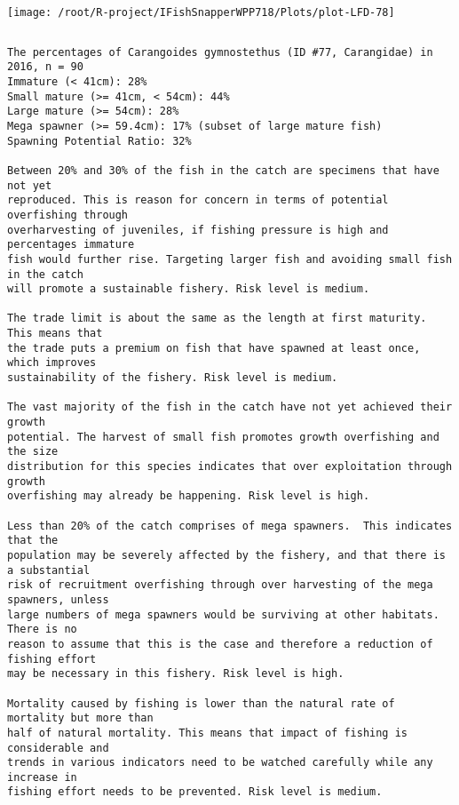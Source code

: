 \documentclass{report}\usepackage[]{graphicx}\usepackage[]{color}
\makeatletter
\def\maxwidth{ %
  \ifdim\Gin@nat@width>\linewidth
    \linewidth
  \else
    \Gin@nat@width
  \fi
}
\newenvironment{kframe}{%
 \def\at@end@of@kframe{}%
 \ifinner\ifhmode%
  \def\at@end@of@kframe{\end{minipage}}%
  \begin{minipage}{\columnwidth}%
 \fi\fi%
 \def\FrameCommand##1{\hskip\@totalleftmargin \hskip-\fboxsep
 \colorbox{shadecolor}{##1}\hskip-\fboxsep
     \hskip-\linewidth \hskip-\@totalleftmargin \hskip\columnwidth}%
 \MakeFramed {\advance\hsize-\width
   \@totalleftmargin\z@ \linewidth\hsize
   \@setminipage}}%
 {\par\unskip\endMakeFramed%
 \at@end@of@kframe}
\newenvironment{knitrout}{}{} %
\makeatother
\begin{document}
\begin{knitrout}
\texttt{[image: /root/R-project/IFishSnapperWPP718/Plots/plot-LFD-78]} 
\begin{kframe}\begin{verbatim}
\end{verbatim}
\end{kframe}
\clearpage
\newpage
\begin{kframe}\begin{verbatim}The percentages of Carangoides gymnostethus (ID #77, Carangidae) in 2016, n = 90
Immature (< 41cm): 28%
Small mature (>= 41cm, < 54cm): 44%
Large mature (>= 54cm): 28%
Mega spawner (>= 59.4cm): 17% (subset of large mature fish)
Spawning Potential Ratio: 32%
 
Between 20% and 30% of the fish in the catch are specimens that have not yet
reproduced. This is reason for concern in terms of potential overfishing through
overharvesting of juveniles, if fishing pressure is high and percentages immature
fish would further rise. Targeting larger fish and avoiding small fish in the catch
will promote a sustainable fishery. Risk level is medium.

The trade limit is about the same as the length at first maturity.  This means that
the trade puts a premium on fish that have spawned at least once, which improves
sustainability of the fishery. Risk level is medium.

The vast majority of the fish in the catch have not yet achieved their growth
potential. The harvest of small fish promotes growth overfishing and the size
distribution for this species indicates that over exploitation through growth
overfishing may already be happening. Risk level is high.

Less than 20% of the catch comprises of mega spawners.  This indicates that the
population may be severely affected by the fishery, and that there is a substantial
risk of recruitment overfishing through over harvesting of the mega spawners, unless
large numbers of mega spawners would be surviving at other habitats. There is no
reason to assume that this is the case and therefore a reduction of fishing effort
may be necessary in this fishery. Risk level is high.
 
Mortality caused by fishing is lower than the natural rate of mortality but more than
half of natural mortality. This means that impact of fishing is considerable and
trends in various indicators need to be watched carefully while any increase in
fishing effort needs to be prevented. Risk level is medium.
 

\end{verbatim}
\end{kframe}
\end{knitrout}
\end{document}
